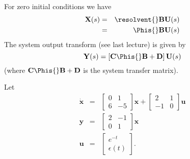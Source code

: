 \begin{slide} \label{slide:l4s11}
For zero initial conditions we have
\begin{eqnarray}\label{eq:l4eq6}
  \mathbf{X}(s)&=&\resolvent{}\mathbf{B}\mathbf{U}(s) \\
&=& \Phis{}\mathbf{B}\mathbf{U}(s) \label{eq:l4eq7}
\end{eqnarray}
The system output transform (see last lecture) is given by
\begin{equation}\label{eq:l4eq8}
 \mathbf{Y}(s)=\left[\mathbf{C}\Phis{}\mathbf{B}+\mathbf{D}\right]\mathbf{U}(s)
\end{equation} (where $\mathbf{C}\Phis{}\mathbf{B}+\mathbf{D}$ is the system transfer
matrix).
\end{slide}
\begin{slide}\label{slide:l4s12}
 Let
\begin{eqnarray*}\dot{\mathbf{x}}&=&\left[\begin{array}{cc}
  0 & 1 \\
  6 & -5
\end{array}\right]\mathbf{x}+\left[\begin{array}{cc}
  2 & 1 \\
 -1 & 0
\end{array}\right]\mathbf{u}\\
\mathbf{y}&=&\left[\begin{array}{cc}
  2 & -1 \\
  0 & 1
\end{array}\right]\mathbf{x}\\ \mathbf{u}&=&\left[\begin{array}{c}
  e^{-t} \\
  \epsilon(t)
\end{array}\right].
\end{eqnarray*}
\end{slide}
